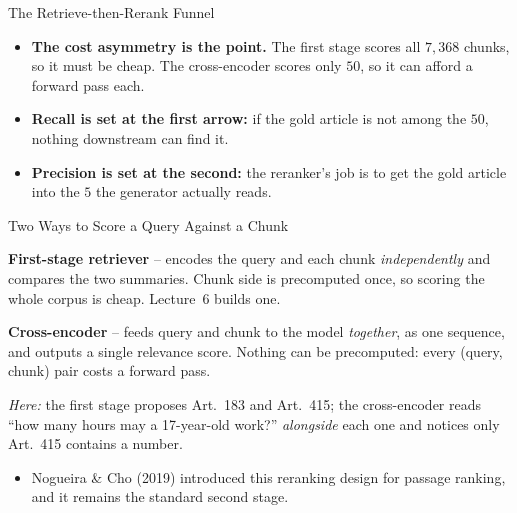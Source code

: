 \begin{frame}{The Retrieve-then-Rerank Funnel}
\centering
{}

\vspace{0.8em}
\small
\begin{itemize}
  \item \textbf{The cost asymmetry is the point.} The first stage scores all $7{,}368$ chunks, so it must be cheap. The cross-encoder scores only $50$, so it can afford a forward pass each.
  \pause
  \item \textbf{Recall is set at the first arrow:} if the gold article is not among the $50$, nothing downstream can find it.
  \pause
  \item \textbf{Precision is set at the second:} the reranker's job is to get the gold article into the $5$ the generator actually reads.
\end{itemize}
\end{frame}

\begin{frame}{Two Ways to Score a Query Against a Chunk}
\begin{rldefinition}
\textbf{First-stage retriever} -- encodes the query and each chunk \emph{independently} and compares the two summaries. Chunk side is precomputed once, so scoring the whole corpus is cheap. Lecture~6 builds one.

\smallskip
\textbf{Cross-encoder} -- feeds query and chunk to the model \emph{together}, as one sequence, and outputs a single relevance score. Nothing can be precomputed: every (query, chunk) pair costs a forward pass.

\smallskip
\emph{Here:} the first stage proposes Art.~183 and Art.~415; the cross-encoder reads ``how many hours may a 17-year-old work?'' \emph{alongside} each one and notices only Art.~415 contains a number.
\end{rldefinition}
\pause
\begin{itemize}
  \item Nogueira \& Cho (2019) introduced this reranking design for passage ranking, and it remains the standard second stage.
\end{itemize}
\end{frame}

